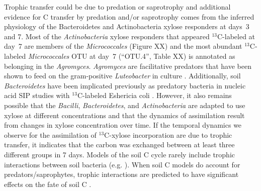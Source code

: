 Trophic transfer could be due to predation or saprotrophy and additional
evidence for C transfer by predation and/or saprotrophy comes from the
inferred physiology of the Bacteroidetes and Actinobacteria xylose responders
at days~3 and 7. Most of the \textit{Actinobacteria} xylose responders that
appeared $^{13}$C-labeled at day~7 are members of the \textit{Micrococcales} (Figure
XX) and the most abundant $^{13}$C-labeled \textit{Micrococcales} OTU at day~7
(“OTU.4”, Table XX) is annotated as belonging in the \textit{Agromyces}.
\textit{Agromyces} are facilitative predators that have been shown to feed on
the gram-positive \textit{Luteobacter} in culture \citep{16346402}.
Additionally, soil \textit{Bacteroidetes} have been implicated previously as
predatory bacteria in nucleic acid SIP studies with $^{13}$C-labeled
Eshericia coli \citep{Lueders2006}. However, it also
remains possible that the \textit{Bacilli}, \textit{Bacteroidetes}, and
\textit{Actinobacteria} are adapted to use xylose at different
concentrations and that the dynamics of assimilation result from changes
in xylose concentration over time. If the temporal dynamics we observe for
the assimilation of $^{13}$C-xylose incorporation are due to trophic
transfer, it indicates that the carbon was exchanged between at least
three different groups in 7 days. Models of the soil C cycle rarely
include trophic interactions between soil bacteria (e.g. \citep{Moore1988}).
When soil C models do account for predators/saprophytes, trophic
interactions are predicted to have significant effects on the fate of soil
C \citep{Kaiser2014a}. 

